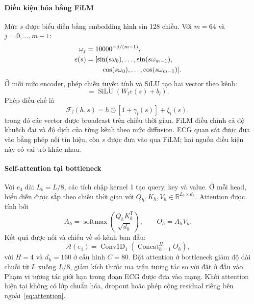 \documentclass[conference]{IEEEtran}
\DeclareMathOperator{\Concat}{Concat}
\DeclareMathOperator{\Conv}{Conv1D}
\DeclareMathOperator{\SiLU}{SiLU}
\DeclareMathOperator{\softmax}{softmax}
\begin{document}
\paragraph{Điều kiện hóa bằng FiLM}
Mức $s$ được biểu diễn bằng embedding hình sin 128 chiều. Với $m=64$ và $j=0,\ldots,m-1$:
\begin{equation}
 \begin{aligned}
 \omega_j&=10000^{-j/(m-1)},\\
 e(s)&=[\sin(s\omega_0),\ldots,\sin(s\omega_{m-1}),\\
     &\hspace{8mm}\cos(s\omega_0),\ldots,\cos(s\omega_{m-1})].
 \end{aligned}
\end{equation}
Ở mỗi mức encoder, phép chiếu tuyến tính và SiLU tạo hai vector theo kênh:
\begin{equation}
 [\gamma_l(s),\xi_l(s)]=\SiLU(W_l e(s)+b_l).
\end{equation}
Phép điều chế là
\begin{equation}
 \mathcal{F}_l(h,s)=h\odot[1+\gamma_l(s)]+\xi_l(s),
 \label{eq:film}
\end{equation}
trong đó các vector được broadcast trên chiều thời gian. FiLM điều chỉnh cả độ khuếch đại và độ dịch của từng kênh theo mức diffusion. ECG quan sát được đưa vào bằng phép nối tín hiệu, còn $s$ được đưa vào qua FiLM; hai nguồn điều kiện này có vai trò khác nhau.

\paragraph{Self-attention tại bottleneck}
Với $e_4$ dài $L_b=L/8$, các tích chập kernel 1 tạo query, key và value. Ở mỗi head, biểu diễn được sắp theo chiều thời gian với $Q_h,K_h,V_h\in\mathbb{R}^{L_b\times d_h}$. Attention được tính bởi
\begin{equation}
 A_h=\softmax\!\left(\frac{Q_h K_h^{\mathsf{T}}}{\sqrt{d_h}}\right),
 \qquad O_h=A_hV_h.
\end{equation}
Kết quả được nối và chiếu về số kênh ban đầu:
\begin{equation}
 \mathcal{A}(e_4)=\Conv_1\!\left(\Concat_{h=1}^{H}O_h\right),
 \label{eq:attention}
\end{equation}
với $H=4$ và $d_h=160$ ở cấu hình $C=80$. Đặt attention ở bottleneck giảm độ dài chuỗi từ $L$ xuống $L/8$, giảm kích thước ma trận tương tác so với đặt ở đầu vào. Phạm vi tương tác giới hạn trong đoạn ECG được đưa vào mạng. Khối attention hiện tại không có lớp chuẩn hóa, dropout hoặc phép cộng residual riêng bên ngoài~\eqref{eq:attention}.
\end{document}
